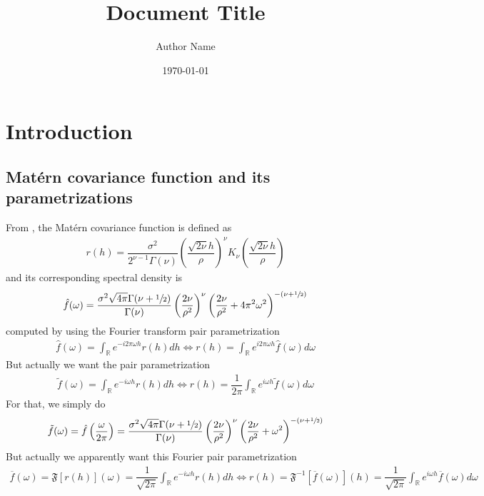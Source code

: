 \documentclass[11pt,a4paper]{article}
\title{Document Title}
\author{Author Name}
\date{\today}
\theoremstyle{plain}
\theoremstyle{definition}
\begin{document}
\maketitle

\section{Introduction}

\subsection{Matérn covariance function and its parametrizations}

From \cite{Rasmussen2006Gaussian}, the Matérn covariance function is defined as 
\begin{align}
    r(h) = \dfrac{\sigma^2}{2^{\nu-1}\Gamma(\nu)}\left(\dfrac{\sqrt{2\nu}h}{\rho}\right)^\nu K_\nu\left(\dfrac{\sqrt{2\nu}h}{\rho}\right)
\end{align}
and its corresponding spectral density is 
\begin{align}
\label{eq:spectral_density_2pi}
    \hat{f}(\omega) = \dfrac{\sigma^2\sqrt{4\pi}\Gamma(\nu+\sfrac{1}{2})}{\Gamma(\nu)}\left(\dfrac{2\nu}{\rho^2}\right)^\nu \left(\dfrac{2\nu}{\rho^2}+4\pi^2\omega^2\right)^{-(\nu+\sfrac{1}{2})}
\end{align}
computed by using the Fourier transform pair parametrization 
\begin{align}
    \hat{f}(\omega) = \int_{\mathbb{R}}e^{-i2\pi\omega h}r(h)dh \iff r(h)=\int_{\mathbb{R}}e^{i2\pi\omega h}\hat{f}(\omega)d\omega
\end{align}
But actually we want the pair parametrization
\begin{align}
    \tilde{f}(\omega) = \int_{\mathbb{R}}e^{-i\omega h}r(h)dh \iff r(h)=\dfrac{1}{2\pi}\int_{\mathbb{R}}e^{i\omega h}\tilde{f}(\omega)d\omega
\end{align}
For that, we simply do
\begin{align}
\label{eq:spectral_density}
    \tilde{f}(\omega) = \hat{f}\left(\dfrac{\omega}{2\pi}\right) = \dfrac{\sigma^2\sqrt{4\pi}\Gamma(\nu+\sfrac{1}{2})}{\Gamma(\nu)}\left(\dfrac{2\nu}{\rho^2}\right)^\nu \left(\dfrac{2\nu}{\rho^2}+\omega^2\right)^{-(\nu+\sfrac{1}{2})}
\end{align}
But actually we apparently want this Fourier pair parametrization
\begin{align}
\label{eq:this_is_THE_Fourier_conv_used}
    \overline{f}(\omega) = \mathfrak{F}[r(h)](\omega) =  \dfrac{1}{\sqrt{2\pi}} \int_{\mathbb{R}}e^{-i\omega h}r(h)dh \iff r(h)= \mathfrak{F}^{-1}[\overline{f}(\omega)](h)= \dfrac{1}{\sqrt{2\pi}}\int_{\mathbb{R}}e^{i\omega h}\overline{f}(\omega)d\omega
\end{align}
\end{document}
